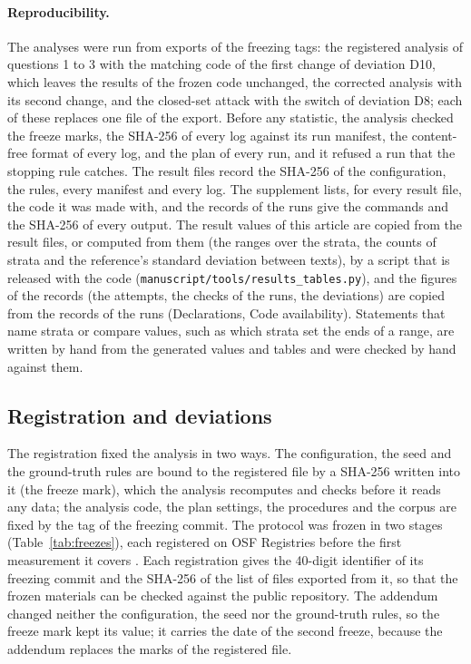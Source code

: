 \paragraph{Reproducibility.} The analyses were run from exports of the freezing tags: the registered analysis of
questions 1 to 3 with the matching code of the first change of deviation D10, which leaves the results of the frozen
code unchanged, the corrected analysis with its second change, and the closed-set attack with the switch of deviation
D8; each of these replaces one file of the export. Before any statistic, the analysis checked the freeze marks, the
SHA-256 of every log against its run manifest, the content-free format of every log, and the plan of every run, and it
refused a run that the stopping rule catches. The result files record the SHA-256 of the configuration, the rules,
every manifest and every log. The supplement lists, for every result file, the code it was made with, and the records
of the runs give the commands and the SHA-256 of every output. The result values of this article are copied from the
result files, or computed from them (the ranges over the strata, the counts of strata and the reference's standard
deviation between texts), by a script that is released with the code (\texttt{manuscript/tools/results\_tables.py}),
and the figures of the records (the attempts, the checks of the runs, the deviations) are copied from the records of
the runs (Declarations, Code availability). Statements that name strata or compare values, such as which strata set the
ends of a range, are written by hand from the generated values and tables and were checked by hand against them.

\subsection{Registration and deviations}
\label{sec:deviations}

The registration fixed the analysis in two ways. The configuration, the seed and the ground-truth rules are bound to the
registered file by a SHA-256 written into it (the freeze mark), which the analysis recomputes and checks before it
reads any data; the analysis code, the plan settings, the procedures and the corpus are fixed by the tag of the
freezing commit. The protocol was frozen in two stages (Table~\ref{tab:freezes}), each registered on OSF Registries
before the first measurement it covers \citep{prereg-macos,prereg-windows}. Each registration gives the 40-digit
identifier of its freezing commit and the SHA-256 of the list of files exported from it, so that the frozen materials
can be checked against the public repository. The addendum changed neither the configuration, the seed nor the
ground-truth rules, so the freeze mark kept its value; it carries the date of the second freeze, because the
addendum replaces the marks of the registered file.

